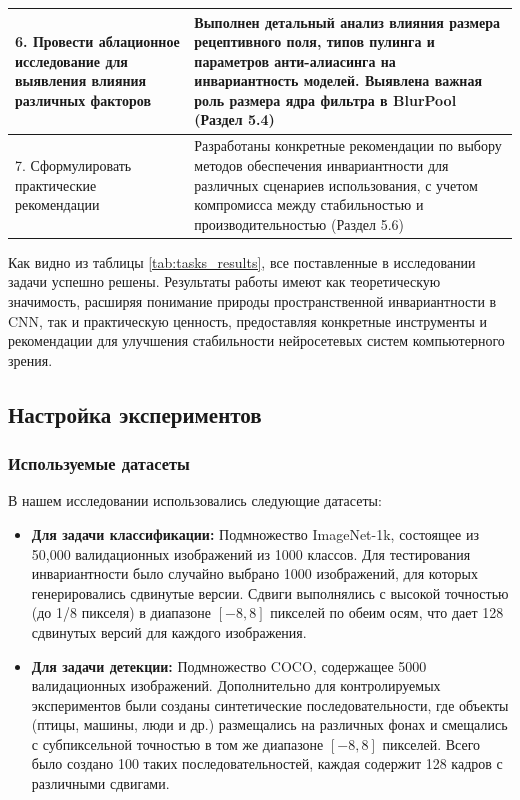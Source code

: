 \begin{table}[ht]
\begin{tabular}{|p{}|p{}|}
6. Провести аблационное исследование для выявления влияния различных факторов & Выполнен детальный анализ влияния размера рецептивного поля, типов пулинга и параметров анти-алиасинга на инвариантность моделей. Выявлена важная роль размера ядра фильтра в BlurPool (Раздел 5.4) \\ \hline
7. Сформулировать практические рекомендации & Разработаны конкретные рекомендации по выбору методов обеспечения инвариантности для различных сценариев использования, с учетом компромисса между стабильностью и производительностью (Раздел 5.6) \\ \hline
\end{tabular}
\end{table}

Как видно из таблицы \ref{tab:tasks_results}, все поставленные в исследовании задачи успешно решены. Результаты работы имеют как теоретическую значимость, расширяя понимание природы пространственной инвариантности в CNN, так и практическую ценность, предоставляя конкретные инструменты и рекомендации для улучшения стабильности нейросетевых систем компьютерного зрения.

\subsection{Настройка экспериментов}
\label{sec:experiments:setup}

\subsubsection{Используемые датасеты}
\label{sec:experiments:setup:datasets}

В нашем исследовании использовались следующие датасеты:

\begin{itemize}
    \item \textbf{Для задачи классификации:} Подмножество ImageNet-1k, состоящее из 50,000 валидационных изображений из 1000 классов. Для тестирования инвариантности было случайно выбрано 1000 изображений, для которых генерировались сдвинутые версии. Сдвиги выполнялись с высокой точностью (до 1/8 пикселя) в диапазоне $[-8, 8]$ пикселей по обеим осям, что дает 128 сдвинутых версий для каждого изображения.
    
    \item \textbf{Для задачи детекции:} Подмножество COCO, содержащее 5000 валидационных изображений. Дополнительно для контролируемых экспериментов были созданы синтетические последовательности, где объекты (птицы, машины, люди и др.) размещались на различных фонах и смещались с субпиксельной точностью в том же диапазоне $[-8, 8]$ пикселей. Всего было создано 100 таких последовательностей, каждая содержит 128 кадров с различными сдвигами.
\end{itemize}

